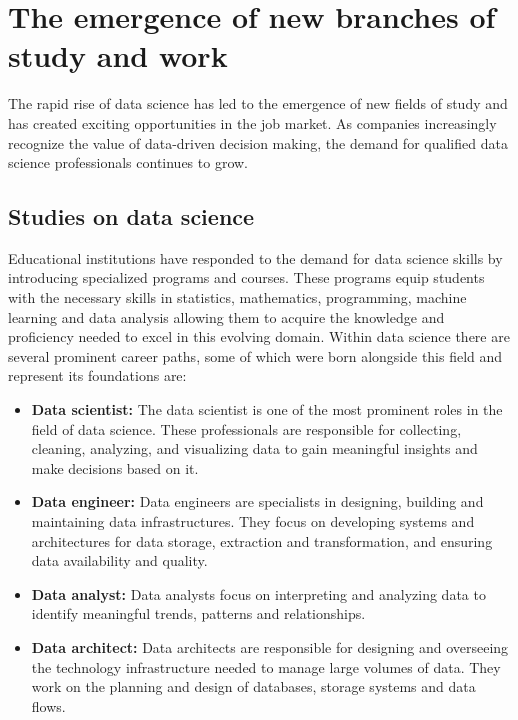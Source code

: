 \documentclass{vgtc}                          %
\begin{document}
\section{The emergence of new branches of study and work}

The rapid rise of data science has led to the emergence of new fields of study and has created exciting opportunities in the job market. As 
companies increasingly recognize the value of data-driven decision making, the demand for qualified data science professionals continues to grow.
 
\subsection{Studies on data science}

Educational institutions have responded to the demand for data science skills by introducing specialized programs and courses. These programs equip students with the necessary 
skills in statistics, mathematics, programming, machine learning and data analysis allowing them to acquire the knowledge and proficiency needed to excel in this evolving domain. 
Within data science there are several prominent career paths, some of which were born alongside this field and represent its foundations are:

\begin{itemize}
  \item \textbf{Data scientist:} The data scientist is one of the most prominent roles in the field of data science. These professionals are responsible for collecting, cleaning, 
  analyzing, and visualizing data to gain meaningful insights and make decisions based on it.
  \item \textbf{Data engineer:} Data engineers are specialists in designing, building and maintaining data infrastructures. They focus on developing systems and architectures for 
  data storage, extraction and transformation, and ensuring data availability and quality.
  \item \textbf{Data analyst:} Data analysts focus on interpreting and analyzing data to identify meaningful trends, patterns and relationships.
  \item \textbf{Data architect:} Data architects are responsible for designing and overseeing the technology infrastructure needed to manage large volumes of data. They work on the 
  planning and design of databases, storage systems and data flows.
\end{itemize} 
\end{document}
